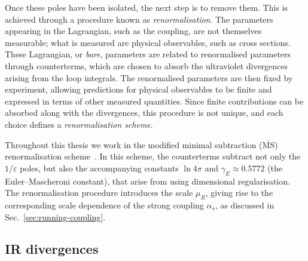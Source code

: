 Once these poles have been isolated, the next step is to remove them. 
This is achieved through a procedure known as
\emph{renormalisation}. The parameters appearing in the Lagrangian,
such as the coupling, are not themselves measurable; what is measured
are physical observables, such as cross sections. These Lagrangian, or
\emph{bare}, parameters are related to renormalised parameters through
counterterms, which are chosen to absorb the ultraviolet divergences
arising from the loop integrals. The renormalised parameters are then
fixed by experiment, allowing predictions for physical observables
to be finite and expressed in terms of other measured quantities. Since finite
contributions can be absorbed along with the divergences, this
procedure is not unique, and each choice defines a
\emph{renormalisation scheme}.

Throughout this thesis we work in the modified minimal subtraction ($\overline{\mathrm{MS}}$) renormalisation scheme~\cite{Bardeen:1978yd}.
In this scheme, the counterterms subtract not only the $1/\varepsilon$ poles, 
but also the accompanying constants $\ln 4\pi$ and $\gamma_E \approx 0.5772$ (the Euler--Mascheroni constant), 
that arise from using dimensional regularisation. The renormalisation procedure introduces the scale $\mu_R$, giving rise to the corresponding scale dependence of the strong coupling $\alpha_s$, as discussed in Sec.~\ref{sec:running-coupling}.


\subsection{IR divergences}
\label{subsec:IR-div}

